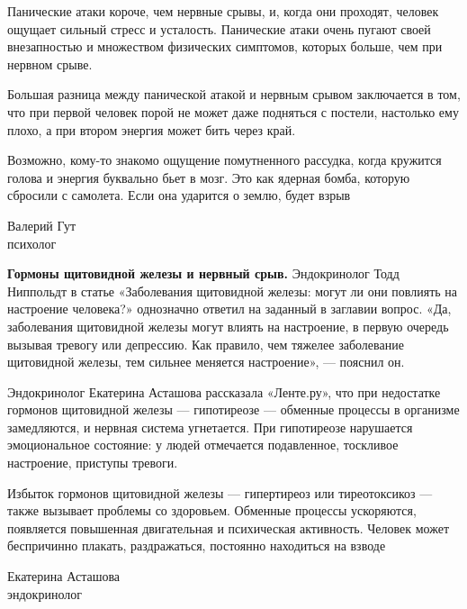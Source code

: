 Панические атаки короче, чем нервные срывы, и, когда они проходят, человек ощущает сильный стресс и усталость. Панические атаки очень пугают своей внезапностью и множеством физических симптомов, которых больше, чем при нервном срыве.

Большая разница между панической атакой и нервным срывом заключается в том, что при первой человек порой не может даже подняться с постели, настолько ему плохо, а при втором энергия может бить через край.

\begin{fancyquotes}
    Возможно, кому-то знакомо ощущение помутненного рассудка, когда кружится голова и энергия буквально бьет в мозг. Это как ядерная бомба, которую сбросили с самолета. Если она ударится о землю, будет взрыв\\

    \begin{flushright}
        Валерий Гут
        \\
        психолог
    \end{flushright}
\end{fancyquotes}

\textbf{Гормоны щитовидной железы и нервный срыв.}
Эндокринолог Тодд Ниппольдт в статье «Заболевания щитовидной железы: могут ли они повлиять на настроение человека?» однозначно ответил на заданный в заглавии вопрос. «Да, заболевания щитовидной железы могут влиять на настроение, в первую очередь вызывая тревогу или депрессию. Как правило, чем тяжелее заболевание щитовидной железы, тем сильнее меняется настроение»,  ---  пояснил он.

Эндокринолог Екатерина Асташова рассказала «Ленте.ру», что при недостатке гормонов щитовидной железы  ---  гипотиреозе  ---  обменные процессы в организме замедляются, и нервная система угнетается. При гипотиреозе нарушается эмоциональное состояние: у людей отмечается подавленное, тоскливое настроение, приступы тревоги.

\begin{fancyquotes}
    Избыток гормонов щитовидной железы  ---  гипертиреоз или тиреотоксикоз  ---  также вызывает проблемы со здоровьем. Обменные процессы ускоряются, появляется повышенная двигательная и психическая активность. Человек может беспричинно плакать, раздражаться, постоянно находиться на взводе\\

    \begin{flushright}
        Екатерина Асташова
        \\
        эндокринолог
    \end{flushright}
\end{fancyquotes}

